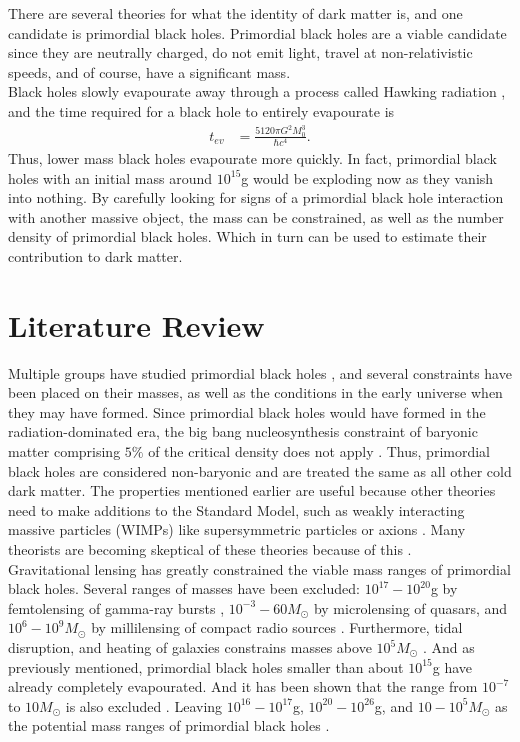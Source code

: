 There are several theories for what the identity of dark matter is, and one candidate is primordial black holes. Primordial black holes are a viable candidate since they are neutrally charged, do not emit light, travel at non-relativistic speeds, and of course, have a significant mass. \\

Black holes slowly evapourate away through a process called Hawking radiation \cite{hawking}, and the time required for a black hole to entirely evapourate is 
\begin{align*}
t_{ev} &= \frac{5120 \pi G^2 M_0^3}{\hbar c^4}.
\end{align*}
Thus, lower mass black holes evapourate more quickly. In fact, primordial black holes with an initial mass around $10^{15}$g would be exploding now as they vanish into nothing. By carefully looking for signs of a primordial black hole interaction with another massive object, the mass can be constrained, as well as the number density of primordial black holes. Which in turn can be used to estimate their contribution to dark matter.

\section{Literature Review}

Multiple groups have studied primordial black holes \cite{bigpaper}, and several constraints have been placed on their masses, as well as the conditions in the early universe when they may have formed. Since primordial black holes would have formed in the radiation-dominated era, the big bang nucleosynthesis constraint of baryonic matter comprising $5\%$ of the critical density does not apply \cite{critdens, cosmology}. Thus, primordial black holes are considered non-baryonic and are treated the same as all other cold dark matter. The properties mentioned earlier are useful because other theories need to make additions to the Standard Model, such as weakly interacting massive particles (WIMPs) like supersymmetric particles or axions \cite{supersym}. Many theorists are becoming skeptical of these theories because of this \cite{pessimism}. \\

Gravitational lensing has greatly constrained the viable mass ranges of primordial black holes. Several ranges of masses have been excluded: $10^{17}-10^{20}$g by femtolensing of gamma-ray bursts \cite{massfemt}, $10^{-3}-60 M_\odot$ by microlensing of quasars, and $10^6-10^9 M_\odot$ by millilensing of compact radio sources \cite{massmilli}. Furthermore, tidal disruption, and heating of galaxies constrains masses above $10^5 M_\odot$ \cite{massheavy}. And as previously mentioned, primordial black holes smaller than about $10^{15}$g have already completely evapourated. And it has been shown that the range from $10^{-7}$ to $10 M_\odot$ is also excluded \cite{mass1}. Leaving $10^{16}-10^{17}$g, $10^{20}-10^{26}$g, and $10-10^{5}M_\odot$ as the potential mass ranges of primordial black holes \cite{massrange}. \\

